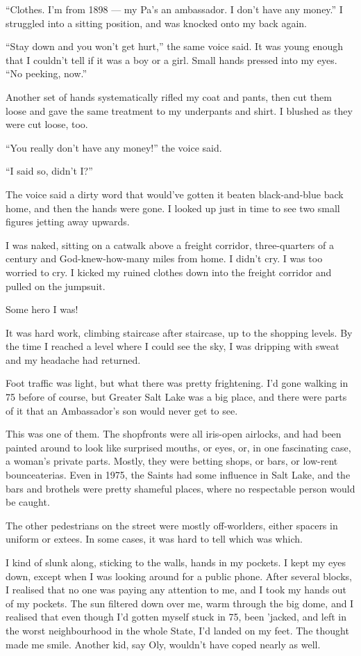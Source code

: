 ``Clothes. I'm from 1898 --- my Pa's an ambassador. I don't have any money.''
I struggled into a sitting position, and was knocked onto my back
again.

``Stay down and you won't get hurt,'' the same voice said. It was
young enough that I couldn't tell if it was a boy or a girl. Small
hands pressed into my eyes. ``No peeking, now.''

Another set of hands systematically rifled my coat and pants, then
cut them loose and gave the same treatment to my underpants and
shirt. I blushed as they were cut loose, too.

``You really don't have any money!'' the voice said.

``I said so, didn't I?''

The voice said a dirty word that would've gotten it beaten
black-and-blue back home, and then the hands were gone. I looked up
just in time to see two small figures jetting away upwards.

I was naked, sitting on a catwalk above a freight corridor,
three-quarters of a century and God-knew-how-many miles from home.
I didn't cry. I was too worried to cry. I kicked my ruined clothes
down into the freight corridor and pulled on the jumpsuit.

Some hero I was!

\tb

It was hard work, climbing staircase after staircase, up to the
shopping levels. By the time I reached a level where I could see
the sky, I was dripping with sweat and my headache had returned.

Foot traffic was light, but what there was pretty frightening. I'd
gone walking in 75 before of course, but Greater Salt Lake was a
big place, and there were parts of it that an Ambassador's son
would never get to see.

This was one of them. The shopfronts were all iris-open airlocks,
and had been painted around to look like surprised mouths, or eyes,
or, in one fascinating case, a woman's private parts. Mostly, they
were betting shops, or bars, or low-rent bounceaterias. Even in
1975, the Saints had some influence in Salt Lake, and the bars and
brothels were pretty shameful places, where no respectable person
would be caught.

The other pedestrians on the street were mostly off-worlders,
either spacers in uniform or extees. In some cases, it was hard to
tell which was which.

I kind of slunk along, sticking to the walls, hands in my pockets.
I kept my eyes down, except when I was looking around for a public
phone. After several blocks, I realised that no one was paying any
attention to me, and I took my hands out of my pockets. The sun
filtered down over me, warm through the big dome, and I realised
that even though I'd gotten myself stuck in 75, been 'jacked, and
left in the worst neighbourhood in the whole State, I'd landed on
my feet. The thought made me smile. Another kid, say Oly, wouldn't
have coped nearly as well.

